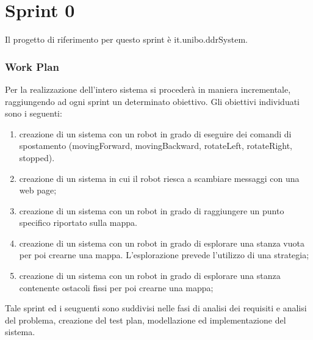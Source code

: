 \section{Sprint 0}
Il progetto di riferimento per questo sprint è it.unibo.ddrSystem.



\newpage


\newpage
\subsubsection{Work Plan}
Per la realizzazione dell'intero sistema si procederà in maniera incrementale, raggiungendo ad ogni sprint un determinato obiettivo. Gli obiettivi individuati sono i seguenti:
\begin{enumerate}

    \item creazione di un sistema con un robot in grado di eseguire dei comandi di spostamento (movingForward, movingBackward, rotateLeft, rotateRight, stopped).
        
    \item creazione di un sistema in cui il robot riesca a scambiare messaggi con una web page;

    \item creazione di un sistema con un robot in grado di raggiungere un punto specifico riportato sulla mappa.
    
    \item creazione di un sistema con un robot in grado di esplorare una stanza vuota per poi crearne una mappa. L'esplorazione prevede l'utilizzo di una strategia;
    
    \item creazione di un sistema con un robot in grado di esplorare una stanza contenente ostacoli fissi per poi crearne una mappa;


    
\end{enumerate}

Tale sprint ed i seuguenti sono suddivisi nelle fasi di analisi dei requisiti e analisi del problema, creazione del test plan, modellazione ed implementazione del sistema.